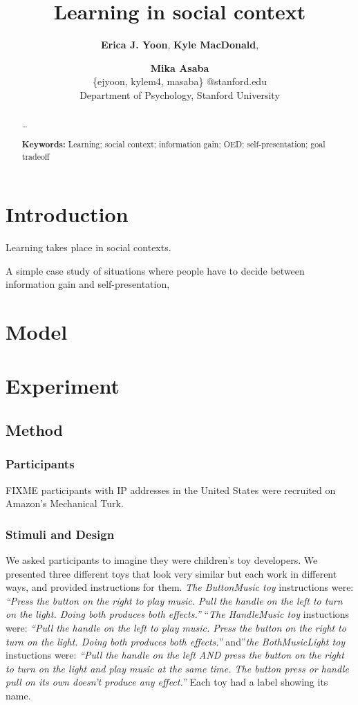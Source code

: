 \documentclass[10pt, letterpaper]{article}
\title{Learning in social context}
\author{{\large \bf Erica J. Yoon}, {\large \bf Kyle MacDonald}, \and {\large \bf Mika Asaba} \\ \{ejyoon, kylem4, masaba\} @stanford.edu \\ Department of Psychology, Stanford University}
\begin{document}
\maketitle

\begin{abstract}
\ldots{}

\textbf{Keywords:}
Learning; social context; information gain; OED; self-presentation; goal
tradeoff
\end{abstract}

\section{Introduction}\label{introduction}

Learning takes place in social contexts.

A simple case study of situations where people have to decide between
information gain and self-presentation,

\section{Model}\label{model}

\section{Experiment}\label{experiment}

\subsection{Method}\label{method}

\subsubsection{Participants}\label{participants}

FIXME participants with IP addresses in the United States were recruited
on Amazon's Mechanical Turk.

\subsubsection{Stimuli and Design}\label{stimuli-and-design}

We asked participants to imagine they were children's toy developers. We
presented three different toys that look very similar but each work in
different ways, and provided instructions for them. \emph{The
ButtonMusic toy} instructions were: \emph{``Press the button on the
right to play music. Pull the handle on the left to turn on the light.
Doing both produces both effects.''} ``\emph{The HandleMusic toy}
instuctions were: \emph{``Pull the handle on the left to play music.
Press the button on the right to turn on the light. Doing both produces
both effects.''} and''\emph{the BothMusicLight toy} instuctions were:
\emph{``Pull the handle on the left AND press the button on the right to
turn on the light and play music at the same time. The button press or
handle pull on its own doesn't produce any effect.''} Each toy had a
label showing its name.
\end{document}
